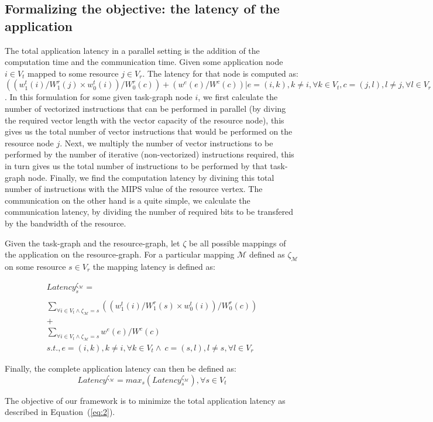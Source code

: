 \subsection{Formalizing the objective: the latency of the application}
\label{sec:form-latency-appl}

The total application latency in a parallel setting is the addition of
the computation time and the communication time. Given some application
node $i \in V_t$ mapped to some resource $j \in V_r$. The latency for
that node is computed as: $((w^t_1(i)/W^r_1(j)\times w^t_0(i))/W^r_0(c))
+ (w^e(e)/W^c(c)) | e = (i,k), k \neq i, \forall k \in V_t, c = (j,l), l
\neq j, \forall l \in V_r $. In this formulation for some given
task-graph node $i$, we first calculate the number of vectorized
instructions that can be performed in parallel (by diving the required
vector length with the vector capacity of the resource node), this gives
us the total number of vector instructions that would be performed on
the resource node $j$. Next, we multiply the number of vector
instructions to be performed by the number of iterative (non-vectorized)
instructions required, this in turn gives us the total number of
instructions to be performed by that task-graph node. Finally, we find
the computation latency by divining this total number of instructions
with the MIPS value of the resource vertex. The communication on the
other hand is a quite simple, we calculate the communication latency, by
dividing the number of required bits to be transfered by the bandwidth
of the resource.

Given the task-graph and the resource-graph, let $\zeta$ be all possible
mappings of the application on the resource-graph. For a particular
mapping $\mathcal{M}$ defined as $\zeta_\mathcal{M}$ on some resource $s
\in V_r$ the mapping latency is defined as:

\begin{equation}
  \begin{array}{c}
    Latency^{\zeta_\mathcal{M}}_s = \\
    \\
    \sum_{\forall i \in V_t \wedge
      \zeta_\mathcal{M} = s} ((w^t_1(i)/W^r_1(s)\times w^t_0(i))/W^r_0(c))
    \\
    +
    \\
    \sum_{\forall i \in V_t \wedge
      \zeta_\mathcal{M} = s} w^e(e) / W^c(c)\\ 
    s.t., e = (i,k), k \neq i, \forall k
    \in V_t \wedge\  c = (s,l), l \neq s, \forall l \in V_r
  \end{array}
  \label{eq:1}
\end{equation}

Finally, the complete application latency can then be defined as: 
\begin{equation}
  \label{eq:2}
  Latency^{\zeta_\mathcal{M}} = max_{s}
  ({Latency^{\zeta_\mathcal{M}}_s}), \forall s \in V_t
\end{equation}

The objective of our framework is to minimize the total application
latency as described in Equation~(\ref{eq:2}).

